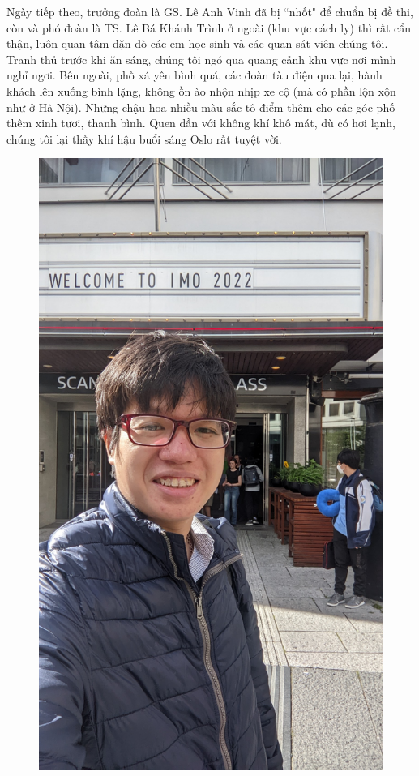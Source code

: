 \begin{multicols}{2}
	\vskip 0.05cm
	Ngày tiếp theo, trưởng đoàn là GS. Lê Anh Vinh đã bị ``nhốt" để chuẩn bị đề thi, còn và phó đoàn là TS. Lê Bá Khánh Trình ở ngoài (khu vực cách ly) thì rất cẩn thận, luôn quan tâm dặn dò các em học sinh và các quan sát viên chúng tôi. Tranh thủ trước khi ăn sáng, chúng tôi ngó qua quang cảnh khu vực nơi mình nghỉ ngơi. Bên ngoài, phố xá yên bình quá, các đoàn tàu điện qua lại, hành khách lên xuống bình lặng, không ồn ào nhộn nhịp xe cộ (mà có phần lộn xộn như ở Hà Nội). Những chậu hoa nhiều màu sắc tô điểm thêm cho các góc phố thêm xinh tươi, thanh bình. Quen dần với không khí khô mát, dù có hơi lạnh, chúng tôi lại thấy khí hậu buổi sáng Oslo rất tuyệt vời. 
	\begin{figure}[H]
		\vspace*{-5pt}
		\centering
		\captionsetup{labelformat= empty, justification=centering}
		\includegraphics[width= 1\linewidth]{figure8109}

\end{figure}
\end{multicols}
